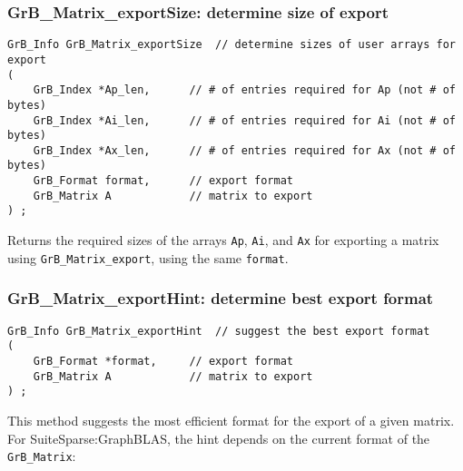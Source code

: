 \documentclass[12pt]{article}
\begin{document}
\newpage
\subsubsection{{\sf GrB\_Matrix\_exportSize:} determine size of export}
\label{export_size}

\begin{mdframed}[userdefinedwidth=6in]
{\footnotesize
\begin{verbatim}
GrB_Info GrB_Matrix_exportSize  // determine sizes of user arrays for export
(
    GrB_Index *Ap_len,      // # of entries required for Ap (not # of bytes)
    GrB_Index *Ai_len,      // # of entries required for Ai (not # of bytes)
    GrB_Index *Ax_len,      // # of entries required for Ax (not # of bytes)
    GrB_Format format,      // export format
    GrB_Matrix A            // matrix to export
) ;
\end{verbatim}
} \end{mdframed}

Returns the required sizes of the arrays \verb'Ap', \verb'Ai', and \verb'Ax'
for exporting a matrix using \verb'GrB_Matrix_export', using the same
\verb'format'.

\subsubsection{{\sf GrB\_Matrix\_exportHint:} determine best export format}
\label{export_hint}

\begin{mdframed}[userdefinedwidth=6in]
{\footnotesize
\begin{verbatim}
GrB_Info GrB_Matrix_exportHint  // suggest the best export format
(
    GrB_Format *format,     // export format
    GrB_Matrix A            // matrix to export
) ;
\end{verbatim}
} \end{mdframed}

This method suggests the most efficient format for the export of a given
matrix.  For SuiteSparse:GraphBLAS, the hint depends on the current
format of the \verb'GrB_Matrix':
\end{document}
